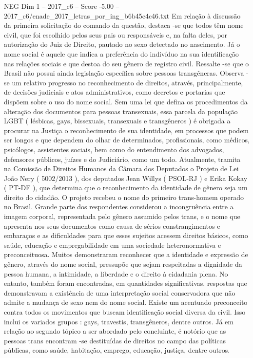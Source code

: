 \begin{textsample}{NEG Dim 1 – 2017\_c6 – Score -5.00 – 2017\_c6/enade\_2017\_letras\_por\_ing\_b6b45c4c46.txt}
Em relação à discussão da primeira solicitação do comando da questão, destaca -se que todos têm nome civil, que foi escolhido pelos seus pais ou responsáveis e, na falta deles, por autorização do Juiz de Direito, pautado no sexo detectado no nascimento.
Já o nome social é aquele que indica a preferência do indivíduo na sua identificação nas relações sociais e que destoa do seu gênero de registro civil.
Ressalte -se que o Brasil não possui ainda legislação específica sobre pessoas transgêneras.
Observa -se um relativo progresso no reconhecimento de direitos, através, principalmente, de decisões judiciais e atos administrativos, como decretos e portarias que dispõem sobre o uso do nome social.
Sem uma lei que defina os procedimentos da alteração dos documentos para pessoas transexuais, essa parcela da população LGBT ( lésbicas, gays, bissexuais, transexuais e transgêneros ) é obrigada a procurar na Justiça o reconhecimento de sua identidade, em processos que podem ser longos e que dependem do olhar de determinados, profissionais, como médicos, psicólogos, assistentes sociais, bem como do entendimento dos advogados, defensores públicos, juízes e do Judiciário, como um todo.
Atualmente, tramita na Comissão de Direitos Humanos da Câmara dos Deputados o Projeto de Lei João Nery ( 5002/2013 ), dos deputados Jean Willys ( PSOL-RJ ) e Erika Kokay ( PT-DF ), que determina que o reconhecimento da identidade de gênero seja um direito do cidadão.
O projeto recebeu o nome do primeiro trans-homem operado no Brasil.
Grande parte dos respondentes considerou a incongruência entre a imagem corporal, representada pelo gênero assumido pelos trans, e o nome que apresenta nos seus documentos como causa de sérios constrangimentos e embaraços e as dificuldades para que esses sujeitos acessem direitos básicos, como saúde, educação e empregabilidade em uma sociedade heteronormativa e preconceituosa.
Muitos demonstraram reconhecer que a identidade e expressão de gênero, através do nome social, pressupõe que sejam respeitadas a dignidade da pessoa humana, a intimidade, a liberdade e o direito à cidadania plena.
No entanto, também foram encontradas, em quantidades significativas, respostas que demonstravam a existência de uma interpretação social conservadora que não admite a mudança de sexo nem do nome social.
Existe um acentuado preconceito contra todos os movimentos que buscam identificação social diversa da civil.
Isso inclui os variados grupos : gays, travestis, transgêneros, dentre outros.
Já em relação ao segundo tópico a ser abordado pelo concluinte, é notório que as pessoas trans encontram -se destituídas de direitos no campo das políticas públicas, como saúde, habitação, emprego, educação, justiça, dentre outros.

\end{textsample}
